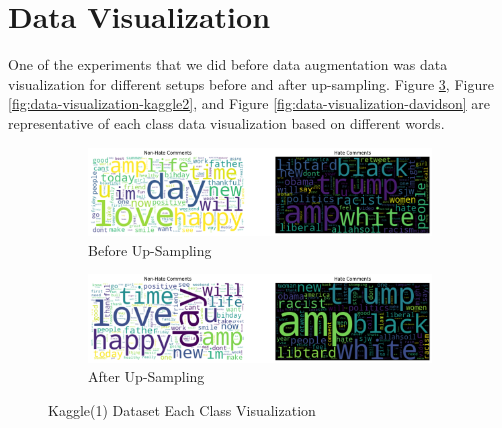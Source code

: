 \documentclass[11pt]{article}
\begin{document}
\newpage

\appendix
\section{Data Visualization}
\label{sec:data-visualization}
One of the experiments that we did before data augmentation was data visualization for different setups before and after up-sampling. Figure \ref{fig:data-visualization-kaggle1}, Figure \ref{fig:data-visualization-kaggle2}, and Figure \ref{fig:data-visualization-davidson} are representative of each class data visualization based on different words.

\begin{figure}[h]
    \centering
    \begin{subfigure}[b]{0.45\textwidth} %
        \centering
        \includegraphics[width=\textwidth]{images/hatespeech_visualization/kaggle(1)-before.png}
        \caption{Before Up-Sampling}
        \label{fig:before-kaggle-1}
    \end{subfigure}
    \hfill
    \begin{subfigure}[b]{0.45\textwidth}
        \centering
        \includegraphics[width=\textwidth]{images/hatespeech_visualization/kaggle(1)-after.png}
        \caption{After Up-Sampling}
        \label{fig:after-kaggle-1}
    \end{subfigure}
    
    \caption{Kaggle(1) Dataset Each Class Visualization}
    \label{fig:data-visualization-kaggle1}
\end{figure}
\end{document}
